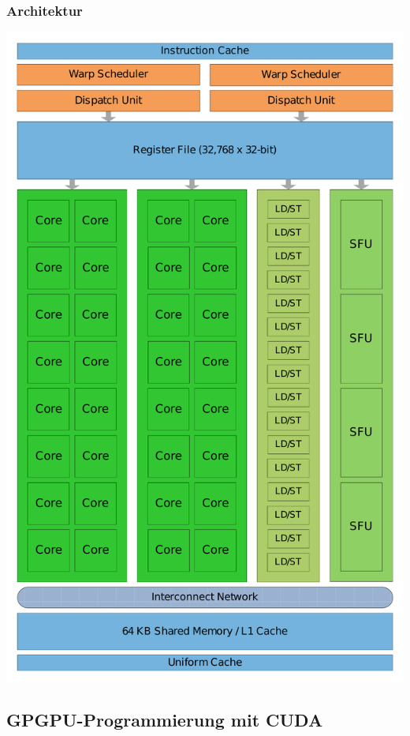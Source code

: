 \subsubsection{Architektur}
\includegraphics[scale=0.2]{mikroprozessoren2/Nvidia-Fermi.pdf}


\subsection{GPGPU-Programmierung mit CUDA}

